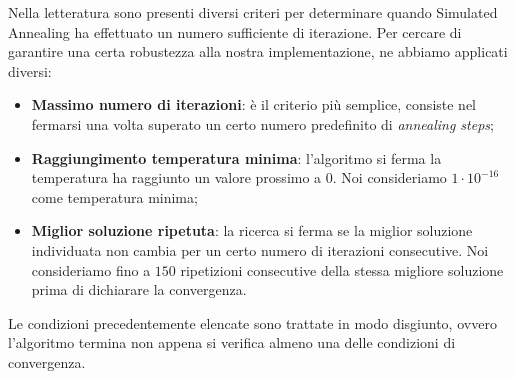 \noindent Nella letteratura sono presenti diversi criteri per determinare quando Simulated Annealing ha effettuato un numero sufficiente di iterazione. Per cercare di garantire una certa robustezza alla nostra implementazione, ne abbiamo applicati diversi:

\begin{itemize}
    \item \textbf{Massimo numero di iterazioni}: è il criterio più semplice, consiste nel fermarsi una volta superato un certo numero predefinito di \textit{annealing steps};
    \item \textbf{Raggiungimento temperatura minima}: l'algoritmo si ferma la temperatura ha raggiunto un valore prossimo a 0. Noi consideriamo $1 \cdot 10^{-16}$ come temperatura minima;
    \item \textbf{Miglior soluzione ripetuta}: la ricerca si ferma se la miglior soluzione individuata non cambia per un certo numero di iterazioni consecutive. Noi consideriamo fino a $150$ ripetizioni consecutive della stessa migliore soluzione prima di dichiarare la convergenza.
\end{itemize}

\noindent Le condizioni precedentemente elencate sono trattate in modo
disgiunto, ovvero l'algoritmo termina non appena si verifica almeno
una delle condizioni di convergenza.
